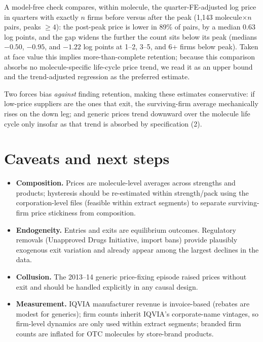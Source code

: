 \documentclass[11pt]{article}
\begin{document}
A model-free check compares, within molecule, the quarter-FE-adjusted log
price in quarters with exactly $n$ firms before versus after the peak
(1{,}143 molecule$\times n$ pairs, peaks $\geq 4$): the post-peak price is
lower in 89\% of pairs, by a median 0.63 log points, and the gap widens the
further the count sits below its peak (medians $-0.50$, $-0.95$, and
$-1.22$ log points at 1--2, 3--5, and 6+ firms below peak). Taken at face
value this implies more-than-complete retention; because this comparison
absorbs no molecule-specific life-cycle price trend, we read it as an upper
bound and the trend-adjusted regression as the preferred estimate.

Two forces bias \emph{against} finding retention, making these estimates
conservative: if low-price suppliers are the ones that exit, the
surviving-firm average mechanically rises on the down leg; and generic
prices trend downward over the molecule life cycle only insofar as that
trend is absorbed by specification (2).

\section{Caveats and next steps}

\begin{itemize}
\item \textbf{Composition.} Prices are molecule-level averages across
strengths and products; hysteresis should be re-estimated within
strength/pack using the corporation-level files (feasible within extract
segments) to separate surviving-firm price stickiness from composition.
\item \textbf{Endogeneity.} Entries and exits are equilibrium outcomes.
Regulatory removals (Unapproved Drugs Initiative, import bans) provide
plausibly exogenous exit variation and already appear among the largest
declines in the data.
\item \textbf{Collusion.} The 2013--14 generic price-fixing episode raised
prices without exit and should be handled explicitly in any causal design.
\item \textbf{Measurement.} IQVIA manufacturer revenue is invoice-based
(rebates are modest for generics); firm counts inherit IQVIA's
corporate-name vintages, so firm-level dynamics are only used within
extract segments; branded firm counts are inflated for OTC molecules by
store-brand products.
\end{itemize}
\end{document}
